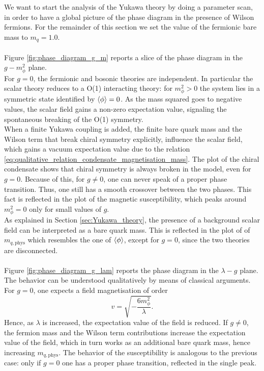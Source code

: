 We want to start the analysis of the Yukawa theory by doing a parameter scan, in order to have a global picture of the phase diagram in the presence of Wilson fermions. For the remainder of this section we set the value of the fermionic bare mass to $m_q = 1.0$.\\~\\
Figure \ref{fig:phase_diagram_g_m} reports a slice of the phase diagram in the $g-m_\phi^2$ plane. \\
For $g=0$, the fermionic and bosonic theories are independent. In particular the scalar theory reduces to a O(1) interacting theory: for $m_\phi^2>0$ the system lies in a symmetric state identified by $\left\langle \phi \right\rangle = 0$. 
As the mass squared goes to negative values, the scalar field gains a non-zero expectation value, signaling the spontaneous breaking of the O(1) symmetry. \\
When a finite Yukawa coupling is added, the finite bare quark mass and the Wilson term that break chiral symmetry explicitly, influence the scalar field, which gains a vacuum expectation value due to the relation \eqref{eq:qualitative_relation_condensate_magnetisation_mass}.
The plot of the chiral condensate shows that chiral symmetry is always broken in the model, even for $g=0$. Because of this, for $g \neq 0$, one can never speak of a proper phase transition. Thus, one still has a smooth crossover between the two phases. This fact is reflected in the plot of the magnetic susceptibility, which peaks around $m_\phi^2 = 0$ only for small values of $g$. \\
As explained in Section \ref{sec:Yukawa_theory}, the presence of a background scalar field can be interpreted as a bare quark mass. This is reflected in the plot of of $m_{q, \text{phys}}$ which resembles the one of $\left\langle \phi \right\rangle$, except for $g=0$, since the two theories are disconnected. \\~\\
Figure \ref{fig:phase_diagram_g_lam} reports the phase diagram in the $\lambda - g$ plane. The behavior can be understood qualitatively by means of classical arguments. 
For $g=0$, one expects a field magnetisation of order 
\begin{equation*}
    v = \sqrt{-\frac{6 m_\phi^2}{\lambda}}.
\end{equation*}
Hence, as $\lambda$ is increased, the expectation value of the field is reduced.
If $g \neq 0$, the fermion mass and the Wilson term contributions increase the expectation value of the field, which in turn works as an additional bare quark mass, hence increasing $m_{q, \text{phys}}$. The behavior of the susceptibility is analogous to the previous case: only if $g=0$ one has a proper phase transition, reflected in the single peak.

